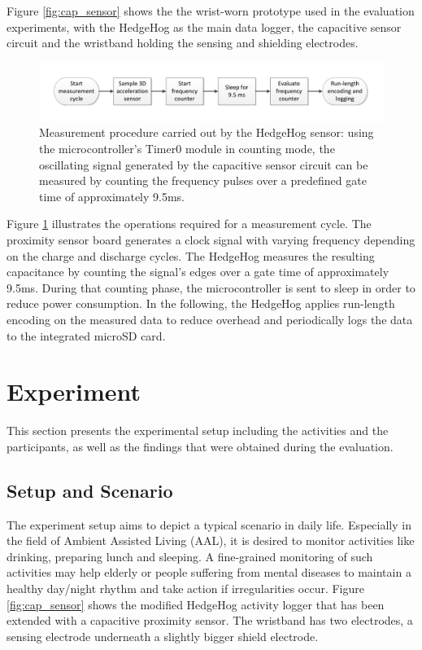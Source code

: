 \documentclass[runningheads,a4paper]{llncs}
\begin{document}
Figure \ref{fig:cap_sensor} shows the the wrist-worn prototype used in the evaluation experiments, with the HedgeHog as the main data logger, the capacitive sensor circuit and the wristband holding the sensing and shielding electrodes.

\begin{figure}
	\centering
 		\includegraphics[trim=1cm 1cm 1cm 1cm,clip,width=\textwidth]{Images/pseudocode.pdf}
	\caption{Measurement procedure carried out by the HedgeHog sensor: using the microcontroller's Timer0 module in counting mode, the oscillating signal generated by the capacitive sensor circuit can be measured by counting the frequency pulses over a predefined gate time of approximately 9.5ms.}
	\label{fig:pseudocode}
\end{figure}

Figure \ref{fig:pseudocode} illustrates the operations required for a measurement cycle. The proximity sensor board generates a clock signal with varying frequency depending on the charge and discharge cycles. The HedgeHog measures the resulting capacitance by counting the signal's edges over a gate time of approximately 9.5ms. During that counting phase, the microcontroller is sent to sleep in order to reduce power consumption. In the following, the HedgeHog applies run-length encoding on the measured data to reduce overhead and periodically logs the data to the integrated microSD card.

\section{Experiment}
\label{sect:experiment}

This section presents the experimental setup including the activities and the participants, as well as the findings that were obtained during the evaluation.

\subsection{Setup and Scenario}

The experiment setup aims to depict a typical scenario in daily life. Especially in the field of Ambient Assisted Living (AAL), it is desired to monitor activities like drinking, preparing lunch and sleeping. A fine-grained monitoring of such activities may help elderly or people suffering from mental diseases to maintain a healthy day/night rhythm and take action if irregularities occur. Figure \ref{fig:cap_sensor} shows the modified HedgeHog activity logger that has been extended with a capacitive proximity sensor. The wristband has two electrodes, a sensing electrode underneath a slightly bigger shield electrode. 
\end{document}
